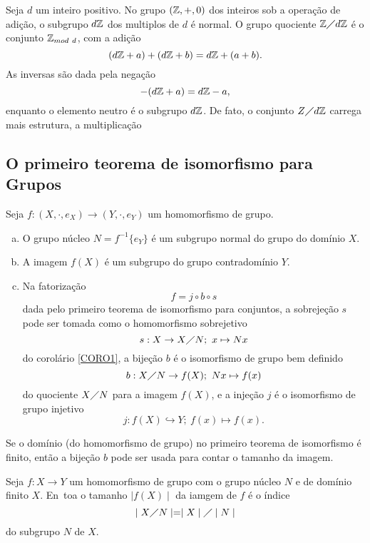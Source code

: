 \begin{definition}[Magma]
\begin{definition}
         \end{definition}
         \begin{exmp}
            Seja $d$ um inteiro positivo. No grupo $(\mathbb{Z}, +, 0)$ dos inteiros sob a operação de adição, o subgrupo $d\mathbb{Z}$ dos multiplos de $d$ é normal. O grupo quociente $\mathbb{Z} \diagup d\mathbb{Z}$ é o conjunto $\mathbb{Z}_{mod\ d}$, com a adição
            $$(d\mathbb{Z} + a) + (d\mathbb{Z} + b) = d\mathbb{Z} + (a + b).$$ As inversas são dada pela negação $$-(d\mathbb{Z} + a) = d\mathbb{Z} - a,$$ enquanto o elemento neutro é o subgrupo $d\mathbb{Z}$.
            De fato, o conjunto $Z\diagup d\mathbb{Z}$ carrega mais estrutura, a multiplicação
         \end{exmp}

   \subsection{O primeiro teorema de isomorfismo para Grupos}
      \begin{theorem}
         Seja $f: (X, \cdot, e_{X}) \to (Y, \cdot, e_{Y})$ um homomorfismo de grupo.
         \begin{enumerate}[(a)]
            \item O grupo núcleo $N = f^{-1}\{e_{Y}\}$ é um subgrupo normal do grupo do domínio $X$.
            \item A imagem $f(X)$ é um subgrupo do grupo contradomínio $Y$.
            \item Na fatorização $$f = j \circ b \circ s$$ dada pelo primeiro teorema de isomorfismo para conjuntos, a sobrejeção $s$ pode ser tomada como o homomorfismo sobrejetivo $$s: X\to X\diagup N;\ x\mapsto Nx$$ do corolário \ref{CORO1}, a bijeção $b$ é o isomorfismo de grupo bem definido $$b: X\diagup N \to f(X);\ Nx \mapsto f(x)$$ do quociente $X\diagup N$ para a imagem $f(X)$, e a injeção $j$ é o isomorfismo de grupo injetivo $$j: f(X) \hookrightarrow Y;\ f(x) \mapsto f(x).$$
         \end{enumerate}
         Se o domínio (do homomorfismo de grupo) no primeiro teorema de isomorfismo é finito, então a bijeção $b$ pode ser usada para contar o tamanho da imagem.
      \end{theorem}
      \begin{corollary}\label{GHOMO}
         Seja $f: X\to Y$ um homomorfismo de grupo com o grupo núcleo $N$ e de domínio finito $X$. En~toa o tamanho $\mid f(X) \mid$ da iamgem de $f$ é o índice $$\mid X\diagup N\mid = \mid X \mid \diagup \mid N \mid$$ do subgrupo $N$ de $X$.
      \end{corollary}

\end{definition}
